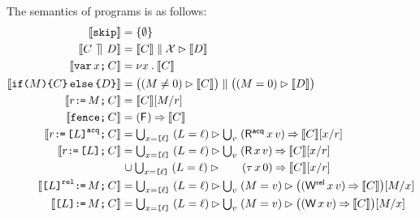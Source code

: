 The semantics of programs is as follows:
\allowdisplaybreaks
\begin{align*}
  \sem{\SKIP} & =
  \{ \emptyset \}
  \\
  \sem{\aCmd \PAR \bCmd} & =
  \sem{\aCmd} \parallel \Loc \guard \sem{\bCmd} 
  \\
  \sem{\VAR\aLoc\SEMI \aCmd} & =
  \nu \aLoc \st \sem{\aCmd}
  \\
  \sem{\IF{\aExp} \THEN \aCmd \ELSE \bCmd \FI} & =
  \bigl((\aExp \neq 0) \guard \sem{\aCmd}\bigr) \parallel \bigl((\aExp=0) \guard \sem{\bCmd}\bigr) 
  \\
  \sem{\aReg\GETS\aExp\SEMI \aCmd} & =
  \sem{\aCmd}[\aExp/\aReg] 
  \\
  \sem{\FENCE\SEMI \aCmd} & =
  (\DF{}) \prefix \sem{\aCmd}
  \\  
  \sem{\aReg\GETS\REFAcq{\cExp}\SEMI \aCmd} & =
  \textstyle\bigcup_{\aLoc=\REF{\cVal}}\; ({\cExp}=\cVal) \guard \textstyle\bigcup_\aVal\; (\DRAcq\aLoc\aVal) \prefix \sem{\aCmd}[\aLoc/\aReg] 
  \\
  \sem{\aReg\GETS\REF{\cExp}\SEMI \aCmd} & =
  \textstyle\bigcup_{\aLoc=\REF{\cVal}}\; ({\cExp}=\cVal) \guard \textstyle\bigcup_\aVal\; (\DR\aLoc\aVal) \prefix \sem{\aCmd}[\aLoc/\aReg] 
  \\ & \mkern2mu\cup \textstyle\bigcup_{\aLoc=\REF{\cVal}}\; ({\cExp}=\cVal) \guard \mkern18mu\;\mkern10mu (\iDR{\aLoc}{0}) \prefix \sem{\aCmd}[\aLoc/\aReg]
  \\
  \sem{\REFRel{\cExp}\GETS\aExp\SEMI \aCmd} & =
  \textstyle\bigcup_{\aLoc=\REF{\cVal}}\; ({\cExp}=\cVal) \guard \textstyle\bigcup_\aVal\;  (\aExp=\aVal) \guard\bigl((\DWRel\aLoc\aVal) \prefix \sem{\aCmd}\bigr)[\aExp/\aLoc] 
  \\
  \sem{\REF{\cExp}\GETS\aExp\SEMI \aCmd} & =
  \textstyle\bigcup_{\aLoc=\REF{\cVal}}\; ({\cExp}=\cVal) \guard \textstyle\bigcup_\aVal\;  (\aExp=\aVal) \guard\bigl((\DW\aLoc\aVal) \prefix \sem{\aCmd}\bigr)[\aExp/\aLoc]

\end{align*}
